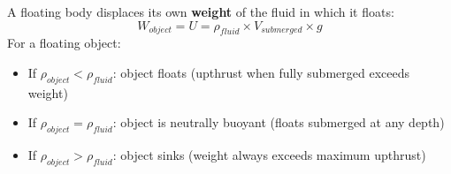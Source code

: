 \begin{lawbox}
A floating body displaces its own \textbf{weight}
of the fluid in which it floats:
\[
  W_{object} = U = \rho_{fluid} \times V_{submerged}
  \times g
\]
For a floating object:
\begin{itemize}[noitemsep]
  \item If $\rho_{object} < \rho_{fluid}$: object
  floats (upthrust when fully submerged exceeds weight)
  \item If $\rho_{object} = \rho_{fluid}$: object
  is neutrally buoyant (floats submerged at any depth)
  \item If $\rho_{object} > \rho_{fluid}$: object
  sinks (weight always exceeds maximum upthrust)
\end{itemize}
\end{lawbox}

